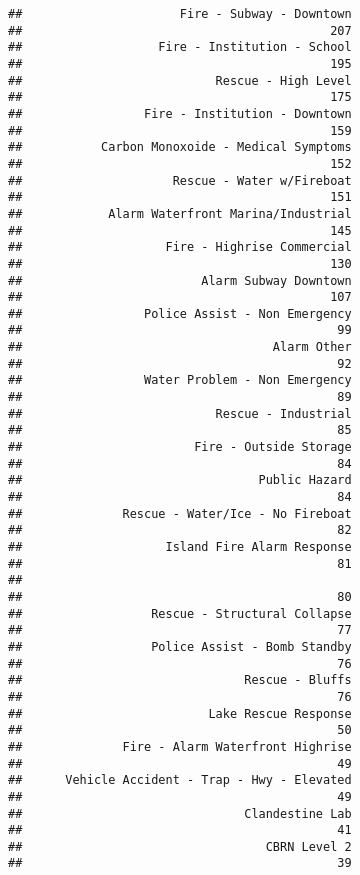 \documentclass[]{article}
\begin{document}
\begin{verbatim}
##                      Fire - Subway - Downtown 
##                                           207 
##                   Fire - Institution - School 
##                                           195 
##                           Rescue - High Level 
##                                           175 
##                 Fire - Institution - Downtown 
##                                           159 
##           Carbon Monoxoide - Medical Symptoms 
##                                           152 
##                     Rescue - Water w/Fireboat 
##                                           151 
##            Alarm Waterfront Marina/Industrial 
##                                           145 
##                    Fire - Highrise Commercial 
##                                           130 
##                         Alarm Subway Downtown 
##                                           107 
##                 Police Assist - Non Emergency 
##                                            99 
##                                   Alarm Other 
##                                            92 
##                 Water Problem - Non Emergency 
##                                            89 
##                           Rescue - Industrial 
##                                            85 
##                        Fire - Outside Storage 
##                                            84 
##                                 Public Hazard 
##                                            84 
##              Rescue - Water/Ice - No Fireboat 
##                                            82 
##                    Island Fire Alarm Response 
##                                            81 
##                                               
##                                            80 
##                  Rescue - Structural Collapse 
##                                            77 
##                  Police Assist - Bomb Standby 
##                                            76 
##                               Rescue - Bluffs 
##                                            76 
##                          Lake Rescue Response 
##                                            50 
##              Fire - Alarm Waterfront Highrise 
##                                            49 
##      Vehicle Accident - Trap - Hwy - Elevated 
##                                            49 
##                               Clandestine Lab 
##                                            41 
##                                  CBRN Level 2 
##                                            39 

\end{verbatim}
\end{document}
